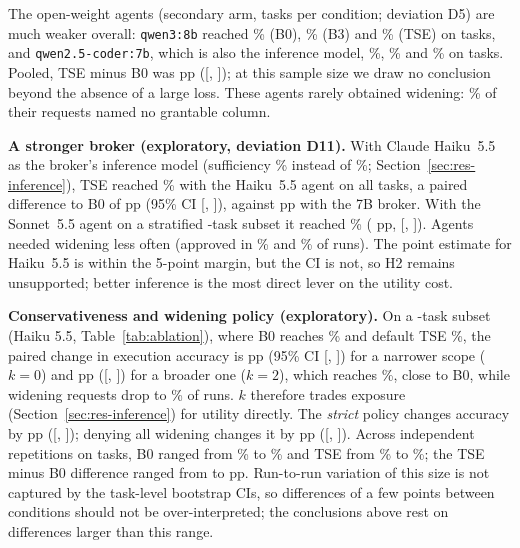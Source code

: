 The open-weight agents (secondary arm, \nRunsPerCondLocal{} tasks per condition; deviation D5) are much weaker
overall: \texttt{qwen3:8b} reached \exLocalQwenBzero\% (B0), \exLocalQwenBthree\% (B3) and \exLocalQwenTse\% (TSE) on
\nLocalQwen{} tasks, and \texttt{qwen2.5-coder:7b}, which is also the inference model, \exLocalCoderBzero\%,
\exLocalCoderBthree\% and \exLocalCoderTse\% on \nLocalCoder{} tasks. Pooled, TSE minus B0 was \dExLocalTse{} pp
([\dExLoLocalTse, \dExHiLocalTse]); at this sample size we draw no conclusion beyond the absence of a large loss. These agents rarely obtained
widening: \localReqNotGranted\% of their requests named no grantable column.

\textbf{A stronger broker (exploratory, deviation D11).} With Claude Haiku~5.5 as the broker's inference model
(sufficiency \suffTsehaiku\% instead of \suffTse\%; Section~\ref{sec:res-inference}), TSE reached \hbExHaiku\% with the
Haiku~5.5 agent on all \hbNHaiku{} tasks, a paired difference to B0 of \hbDHaiku{} pp (95\% CI [\hbDLoHaiku,
\hbDHiHaiku]), against \dExHaikuTse{} pp with the 7B broker. With the Sonnet~5.5 agent on a stratified \hbNSonnet-task
subset it reached \hbExSonnet\% (\hbDSonnet{} pp, [\hbDLoSonnet, \hbDHiSonnet]). Agents needed widening less often
(approved in \hbWappHaiku\% and \hbWappSonnet\% of runs). The point estimate for Haiku~5.5 is within the 5-point
margin, but the CI is not, so H2 remains unsupported; better inference is the most direct lever on the utility cost.

\textbf{Conservativeness and widening policy (exploratory).} On a \ablN-task subset (Haiku 5.5,
Table~\ref{tab:ablation}), where B0 reaches \ablExBzero\% and default TSE \ablExDefault\%, the paired change in execution accuracy is
\ablDKzero{} pp (95\% CI [\ablDLoKzero, \ablDHiKzero]) for a narrower scope ($k{=}0$) and \ablDKtwo{} pp
([\ablDLoKtwo, \ablDHiKtwo]) for a broader one ($k{=}2$), which reaches \ablExKtwo\%, close to B0, while widening requests drop to
\ablWreqKtwo\% of runs. $k$ therefore trades exposure (Section~\ref{sec:res-inference}) for utility directly. The
\emph{strict} policy changes accuracy by \ablDStrict{} pp ([\ablDLoStrict, \ablDHiStrict]); denying all widening
changes it by \ablDDeny{} pp ([\ablDLoDeny, \ablDHiDeny]). Across \seedReps{} independent repetitions on \seedSubsetN{}
tasks, B0 ranged from \seedExBzeroMin\% to \seedExBzeroMax\% and TSE from \seedExTseMin\% to \seedExTseMax\%; the TSE
minus B0 difference ranged from \seedDiffMin{} to \seedDiffMax{} pp. Run-to-run variation of this size is not
captured by the task-level bootstrap CIs, so differences of a few points between conditions should not be
over-interpreted; the conclusions above rest on differences larger than this range.

